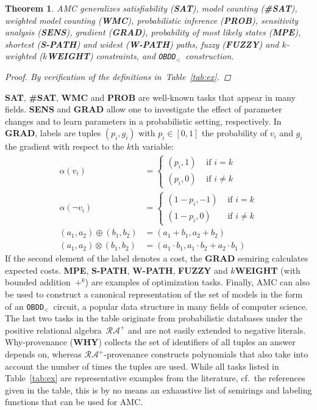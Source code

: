 \documentclass{article}
\theoremstyle{plain}
\newtheorem{theorem}{Theorem}
\theoremstyle{definition}
\newcommand{\OBDDo}{{\tt OBDD$_<$}}
\begin{document}
\begin{theorem}\label{th:instances}
AMC generalizes satisfiability (\textbf{SAT}), model
counting (\textbf{\#SAT}), weighted model counting (\textbf{WMC}),  
probabilistic inference (\textbf{PROB}), sensitivity analysis
(\textbf{SENS}), gradient (\textbf{GRAD}), probability of most likely states (\textbf{MPE}),
shortest (\textbf{S-PATH}) and widest (\textbf{W-PATH})  paths, fuzzy (\textbf{FUZZY})
and $k$-weighted (\textbf{$k$WEIGHT}) constraints, and \OBDDo\
construction.
\begin{proof}
By verification of the definitions in~Table~\ref{tab:ex}. 
\end{proof}
\end{theorem}
\textbf{SAT}, \textbf{\#SAT}, \textbf{WMC} and
\textbf{PROB} are well-known tasks that appear in many fields. 
\textbf{SENS} and \textbf{GRAD} allow one to investigate the effect
of parameter changes and to learn parameters in a
probabilistic setting, respectively. 
In \textbf{GRAD}, labels are tuples $(p_i,g_i)$ with  $p_i\in[0,1]$
the probability of $v_i$ and $g_i$ the gradient with respect to the
$k$th variable:
\begin{align}
\alpha(v_i) & =
  \left\{ \begin{array}{ll}
     (p_i,1) & \mbox{ if }i=k \\
    (p_i,0)& \mbox{ if }i\neq k
  \end{array} \right.\label{eq:gradalpha}\\
\alpha(\neg v_i) & =
  \left\{ \begin{array}{ll}
    (1-p_i, -1) & \mbox{ if }i=k \\
     (1-p_i, 0)& \mbox{ if }i\neq k
  \end{array} \right.\label{eq:gradoveralpha}\\
(a_1,a_2)\oplus (b_1,b_2) &= (a_1+b_1, a_2+b_2)\label{eq:gradoplus}\\
(a_1,a_2)\otimes (b_1,b_2) &= (a_1\cdot b_1, a_1\cdot b_2 + a_2\cdot b_1)\label{eq:gradotimes}
\end{align}
If the second element of the label denotes a cost, the \textbf{GRAD} semiring
calculates expected costs. 
\textbf{MPE}, \textbf{S-PATH},  \textbf{W-PATH},  \textbf{FUZZY}  and
\textbf{$k$WEIGHT} (with bounded addition~$+^k$) are examples of
optimization tasks. Finally, AMC can also
be used to construct a canonical representation of the set of models
in the form of an \OBDDo\ circuit, a popular data structure in many
fields of computer science. 
The last two tasks in the table originate from probabilistic databases under the positive 
relational algebra~$\mathcal{RA^+}$ and are not easily extended to
negative literals. Why-provenance (\textbf{WHY})
collects the set of identifiers of all tuples an answer depends on, whereas 
$\mathcal{RA^+}$-provenance constructs polynomials that also take into
account the number of times the tuples are used.
While all tasks listed in Table~\ref{tab:ex} are representative examples from the literature, cf.~the references given in
the table, this is by no means an exhaustive list of semirings
and labeling functions that can be used for AMC.
\end{document}
